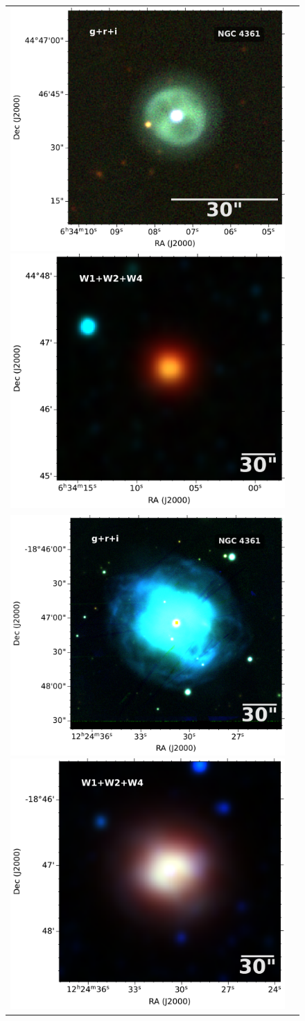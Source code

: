 \documentclass[twocolumn]{article}
\begin{document}
\begin{figure}
  \centering
  \begin{tabular}{l l}
\includegraphics[width=0.52\linewidth]{../known-pn/NGC2242/cutout_rings.v3.skycell.2243.029.stk.i.unconv-irg-RGB.pdf}
\includegraphics[width=0.5\linewidth]{../known-pn/NGC2242/0979p454_ac51-w4-int-3_ra98.53061791727998_dec44.77716333248_asec200.000-421-RGB.pdf}\\
\includegraphics[width=0.52\linewidth]{../known-pn/NGC4361/cutout_rings.v3.skycell.0924.030.stk.i.unconv-irg-RGB.pdf}
\includegraphics[width=0.5\linewidth]{../known-pn/NGC4361/1855m182_ac51-w4-int-3_ra186.12812938647002_dec-18.78487981564_asec200.000-421-RGB}\\

\end{tabular}
\end{figure}
\end{document}
